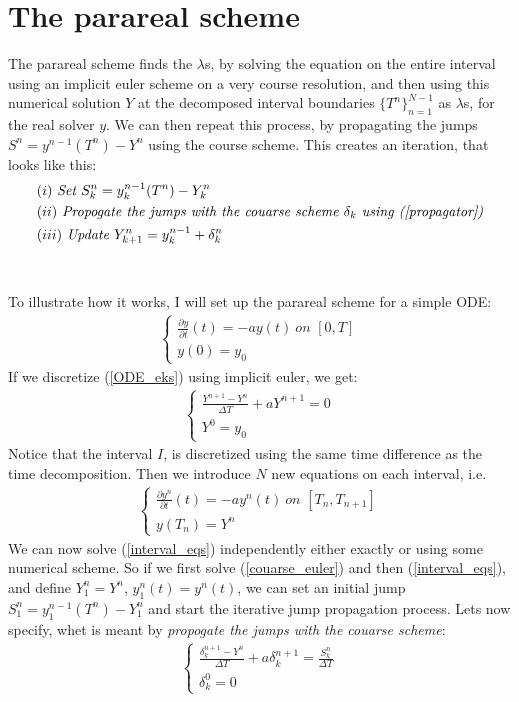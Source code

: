 \documentclass[11pt,a4paper]{article}
\begin{document}
\section{The parareal scheme} 
The parareal scheme finds the $\lambda$s, by solving the equation on the entire interval using an implicit euler scheme on a very course resolution, and then using this numerical solution $Y$ at the decomposed interval boundaries $\{T^n\}_{n=1}^{N-1}$ as $\lambda$s, for the real solver $y$. We can then repeat this process, by propagating the jumps $S^n=y^{n-1}(T^n)-Y^n$ using the course scheme. This creates an iteration, that looks like this:
\begin{align*}
&(i) \ \textit{Set $S^n_k = y_k^{n-1}(T^n)-Y_k^n$} \\
&(ii) \ \textit{Propogate the jumps with the couarse scheme $\delta_k$ using (\ref{propagator})} \\
&(iii) \ \textit{Update $Y_{k+1}^n=y_k^{n-1} + \delta_k^n$}
\end{align*} 
\\
\\
To illustrate how it works, I will set up the parareal scheme for a simple ODE:
\begin{align}
\left\{
     \begin{array}{lr}
		\frac{\partial y}{\partial t}(t)=-ay(t) \ 				\textit{on $[0,T]$} \\
		y(0)=y_0
	\end{array}
\right.	\label{ODE_eks}
\end{align}
If we discretize (\ref{ODE_eks}) using implicit euler, we get:
\begin{align}
\left\{
     \begin{array}{lr}
		\frac{Y^{n+1}-Y^{n}}{\Delta T}+aY^{n+1}=0  \\
		Y^0=y_0
	\end{array}
\right.	\label{couarse_euler}
\end{align}
Notice that the interval $I$, is discretized using the same time difference as the time decomposition. Then we introduce $N$ new equations on each interval, i.e.
\begin{align}
\left\{
     \begin{array}{lr}
		\frac{\partial y^n}{\partial t}(t)=-ay^n(t) \ 				\textit{on $[T_n,T_{n+1}]$} \\
		y(T_n)=Y^n
	\end{array}
\right. \label{interval_eqs}
\end{align}
We can now solve (\ref{interval_eqs}) independently either exactly or using some numerical scheme. So if we first solve (\ref{couarse_euler}) and then (\ref{interval_eqs}), and define $Y_1^n=Y^n$, $y_1^n(t)=y^n(t)$, we can set an initial jump $S_1^n=y_1^{n-1}(T^n)-Y_1^n$ and start the iterative jump propagation process. Lets now specify, whet is meant by \textit{propogate the jumps with the couarse scheme}:
\begin{align}
\left\{
     \begin{array}{lr}
		\frac{\delta_k^{n+1}-Y^{n}}{\Delta T}+a\delta_k^{n+1}=\frac{S_k ^n}{\Delta T}  \\
		\delta_k^0=0
	\end{array}
\right. \label{propagator}
\end{align} 
\end{document}

